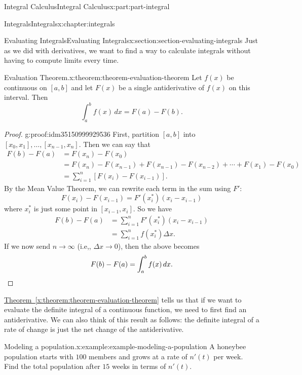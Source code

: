 \documentclass[twoside,10pt,]{tufte-book}
\newcommand{\xreffont}{\relax}
\numberwithin{equation}{part}
\newcommand{\qedhere}{\relax}
\begin{document}
\begin{partptx}{Integral Calculus}{}{Integral Calculus}{}{}{x:part:part-integral}
\begin{chapterptx}{Integrals}{}{Integrals}{}{}{x:chapter:integrals}
\begin{sectionptx}{Evaluating Integrals}{}{Evaluating Integrals}{}{}{x:section:section-evaluating-integrals}
Just as we did with derivatives, we want to find a way to calculate integrals without having to compute limits every time.%
\begin{theorem}{Evaluation Theorem.}{}{x:theorem:theorem-evaluation-theorem}%
Let \(f(x)\) be continuous on \([a,b]\) and let \(F(x)\) be a single antiderivative of \(f(x)\) on this interval. Then%
\begin{equation*}
\int_{a}^{b}f(x)\,dx = F(a) - F(b).
\end{equation*}
%
\end{theorem}
\begin{proof}{}{g:proof:idm35150999929536}
First, partition \([a,b]\) into \([x_{0},x_{1}],\ldots,[x_{n-1},x_{n}]\). Then we can say that%
\begin{align*}
F(b) - F(a) & = F(x_{n}) - F(x_{0}) \\
& = F(x_{n}) - F(x_{n-1}) + F(x_{n-1}) - F(x_{n-2}) + \cdots + F(x_{1}) - F(x_{0}) \\
& = \sum_{i=1}^{n}[F(x_{i}) - F(x_{i-1})]. 
\end{align*}
By the Mean Value Theorem, we can rewrite each term in the sum using \(F'\):%
\begin{equation*}
F(x_{i}) - F(x_{i-1}) = F'(x_{i}^{*})(x_{i} - x_{i-1})
\end{equation*}
where \(x_{i}^{*}\) is just some point in \([x_{i-1},x_{i}]\). So we have%
\begin{align*}
F(b) - F(a) & = \sum_{i=1}^{n}F'(x_{i}^{*})(x_{i} - x_{i-1}) \\
& = \sum_{i=1}^{n}f(x_{i}^{*})\Delta x. 
\end{align*}
If we now send \(n\to\infty\) (i.e,, \(\Delta x\to 0\)), then the above becomes%
\begin{equation*}
F(b) - F(a) = \int_{a}^{b}f(x)\,dx.\qedhere
\end{equation*}
%
\end{proof}
\hyperref[x:theorem:theorem-evaluation-theorem]{Theorem~{\xreffont\ref{x:theorem:theorem-evaluation-theorem}}} tells us that if we want to evaluate the definite integral of a continuous function, we need to first find an antiderivative. We can also think of this result as follows: the definite integral of a rate of change is just the net change of the antiderivative.%
\begin{example}{Modeling a population.}{x:example:example-modeling-a-population}%
A honeybee population starts with \(100\) members and grows at a rate of \(n'(t)\) per week. Find the total population after \(15\) weeks in terms of \(n'(t)\).%

\end{example}
\end{sectionptx}
\end{chapterptx}
\end{partptx}
\end{document}
